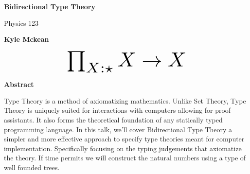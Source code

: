 \documentclass{article}
\begin{document}
\thispagestyle{plain}
\begin{center}
    \Large
    \textbf{Bidirectional Type Theory}
    
    \vspace{0.4cm}
    \large
    Physics 123
    
    \vspace{0.4cm}
    \textbf{Kyle Mckean}


    \begin{equation*}
      \scalebox{3}{
        $\prod_{X : \star} X \rightarrow X$
      }
    \end{equation*}
    
    \vspace{0.4cm}
    \textbf{Abstract}
\end{center}
Type Theory is a method of axiomatizing mathematics. Unlike Set Theory, Type
Theory is uniquely suited for interactions with computers allowing
for proof assistants. It also forms the theoretical foundation
of any statically typed programming language. In this talk, we'll cover
Bidirectional Type Theory a simpler and more effective approach to specify type
theories meant for computer implementation. Specifically focusing on the typing
judgements that axiomatize the theory. If time permits we will construct
the natural numbers using a type of well founded trees.
\end{document}
